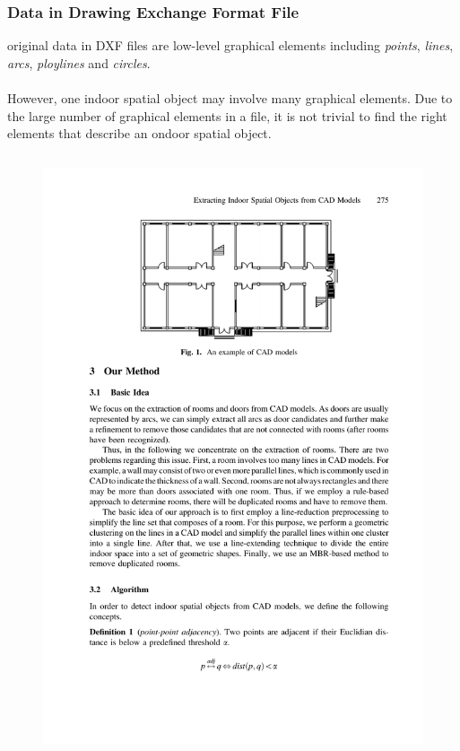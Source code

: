 \begin{frame}
\frametitle{Data in Drawing Exchange Format File}

original data in DXF files are low-level graphical elements including \emph{points}, \emph{lines}, \emph{arcs}, \emph{ploylines} and \emph{circles}.\\~\\

However, one indoor spatial object may involve many graphical elements. Due to the large number of graphical elements in a file, it is not trivial to find the right elements that describe an ondoor spatial object.

\begin{columns}

  \begin{figure}[tb]
    \includegraphics[width=0.9\columnwidth]{figures/2-8/2-8-1.pdf}
  \end{figure}


\end{columns}

\end{frame}

